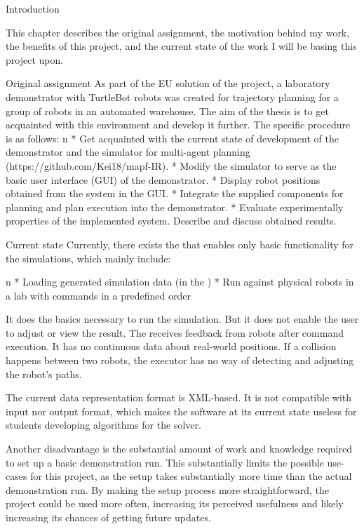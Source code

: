 \chap Introduction

This chapter describes the original assignment, the motivation behind my work, the benefits of this project, and the current state of the work I will be basing this project upon.

\sec Original assignment
As part of the EU solution of the {\safeLog} project, a laboratory demonstrator with TurtleBot robots was created for trajectory planning for a group of robots in an automated warehouse. The aim of the thesis is to get acquainted with this environment and develop it further. The specific procedure is as follows:
\begitems \style n
    * Get acquainted with the current state of development of the demonstrator and the simulator for multi-agent planning (https://github.com/Kei18/mapf-IR).
    * Modify the simulator to serve as the basic user interface (GUI) of the demonstrator.
    * Display robot positions obtained from the {\vicon} system in the GUI.
    * Integrate the supplied components for planning and plan execution into the demonstrator.
    * Evaluate experimentally properties of the implemented system. Describe and discuss obtained results.
\enditems

\sec Current state
Currently, there exists the {\oldRepo} that enables only basic functionality for the simulations, which mainly include:

\begitems \style n
    * Loading generated simulation data (in the {\oldFormat})
    * Run against physical robots in a lab with commands in a predefined order
\enditems

It does the basics necessary to run the simulation. But it does not enable the user to adjust or view the result. The {\oldRepo} receives feedback from robots after command execution. It has no continuous data about real-world positions. If a collision happens between two robots, the executor has no way of detecting and adjusting the robot's paths.

The current data representation format is XML-based. It is not compatible with {\mapfIR} input nor output format, which makes the software at its current state useless for students developing algorithms for the {\mapfIR} solver. 

Another disadvantage is the substantial amount of work and knowledge required to set up a basic demonstration run. This substantially limits the possible use-cases for this project, as the setup takes substantially more time than the actual demonstration run. By making the setup process more straightforward, the project could be used more often, increasing its perceived usefulness and likely increasing its chances of getting future updates.

